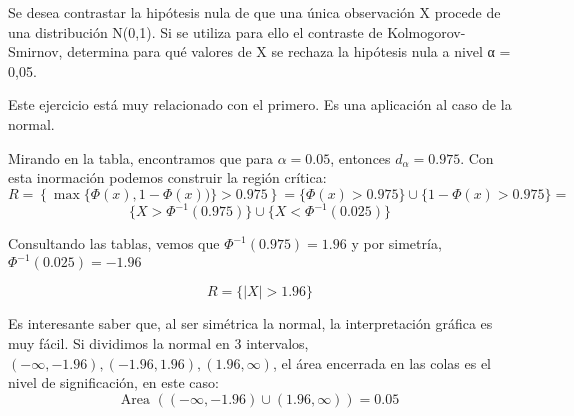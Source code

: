 \begin{problem}[2] Se desea contrastar la hipótesis nula de que una única observación X procede de una distribución N(0,1). Si se utiliza para ello el contraste de Kolmogorov-Smirnov, determina para qué valores de X se rechaza la hipótesis nula a nivel α = 0,05.
\solution

Este ejercicio está muy relacionado con el primero. Es una aplicación al caso de la normal.


Mirando en la tabla, encontramos que para $α = 0.05$, entonces $d_α = 0.975$. Con esta inormación podemos construir la región crítica:
\[ R = \left\{\max\{\Phi(x), 1 - \Phi(x))\} > 0.975\right\} = \{\Phi(x) > 0.975\} \cup \{1 - \Phi(x) > 0.975\} =\]
\[ \{ X>\Phi^{-1}(0.975)\} \cup \{X < \Phi^{-1}(0.025)\}\]

Consultando las tablas, vemos que $\Phi^{-1}(0.975) = 1.96$ y por simetría, $\Phi^{-1}(0.025) = -1.96$

\[R = \{|X| > 1.96\}\]


\obs Es interesante saber que, al ser simétrica la normal, la interpretación gráfica es muy fácil. Si dividimos la normal en 3 intervalos, $(-∞ , -1.96) , (-1.96,1.96) , (1.96, ∞)$, el área encerrada en las colas es el nivel de significación, en este caso: \[\text{Area }\left((-∞ , -1.96)\cup (1.96, ∞)\right) = 0.05\]

\end{problem}



